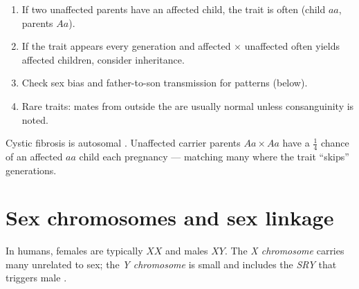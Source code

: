 \begin{method}\label{met:g11:human-genetics:read}
\begin{enumerate}
  \item If two unaffected parents have an affected child, the trait is often
         (child $aa$, parents $Aa$).
  \item If the trait appears every generation and affected $\times$ unaffected
        often yields affected children, consider  inheritance.
  \item Check sex bias and father-to-son transmission for  patterns
        (below).
  \item Rare traits: mates from outside the  are usually 
        normal unless consanguinity is noted.
\end{enumerate}
\end{method}

\begin{example}\label{ex:g11:human-genetics:ar}
Cystic fibrosis is autosomal . Unaffected carrier parents $Aa \times Aa$
have a $\tfrac14$ chance of an affected $aa$ child each pregnancy --- matching
many  where the trait ``skips'' generations.
\end{example}

\section{Sex chromosomes and sex linkage}

\begin{definition}\label{def:g11:human-genetics:sexchrom}
In humans, females are typically $XX$ and males $XY$. The \emph{X
chromosome} carries many  unrelated to sex; the
\emph{Y chromosome} is small and includes the
\emph{SRY}  that triggers male .
\end{definition}


